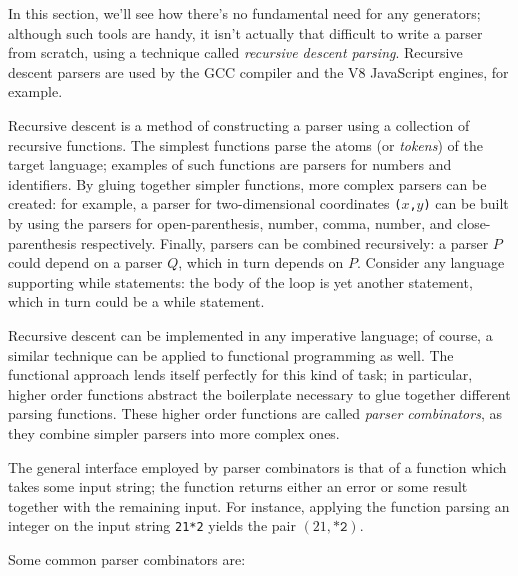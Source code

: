 \documentclass[11pt, american, draft]{PhdThesis}
\begin{document}
  In this section, we'll see how there's no fundamental need for any generators; although such tools
  are handy, it isn't actually that difficult to write a parser from scratch, using a technique
  called \emph{recursive descent parsing}. Recursive descent parsers are used by the GCC compiler
  and the V8 JavaScript engines, for example\cite{nystrom}.

  Recursive descent is a method of constructing a parser using a collection of recursive functions.
  The simplest functions parse the atoms (or \emph{tokens}) of the target language; examples of such
  functions are parsers for numbers and identifiers. By gluing together simpler functions, more
  complex parsers can be created: for example, a parser for two-dimensional coordinates
  \mbox{\texttt{($x$,$y$)}} can be built by using the parsers for open-parenthesis, number, comma,
  number, and close-parenthesis respectively. Finally, parsers can be combined recursively: a parser
  $P$ could depend on a parser $Q$, which in turn depends on $P$. Consider any language supporting
  while statements: the body of the loop is yet another statement, which in turn could be a while
  statement.

  Recursive descent can be implemented in any imperative language; of course, a similar technique
  can be applied to functional programming as well. The functional approach lends itself perfectly
  for this kind of task; in particular, higher order functions abstract the boilerplate necessary to
  glue together different parsing functions. These higher order functions are called \emph{parser
  combinators}, as they combine simpler parsers into more complex ones.

  The general interface employed by parser combinators is that of a function which takes some input
  string; the function returns either an error or some result together with the remaining input. For
  instance, applying the function parsing an integer on the input string \verb$21*2$ yields the
  pair \mbox{$\left(21, \texttt{*2}\right)$}.

  Some common parser combinators are:
\end{document}
